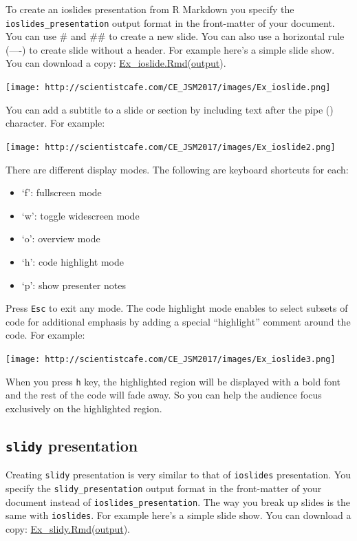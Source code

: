 \documentclass[]{book}
\theoremstyle{definition}
\theoremstyle{definition}
\theoremstyle{remark}
\begin{document}
To create an ioslides presentation from R Markdown you specify the
\texttt{ioslides\_presentation} output format in the front-matter of
your document. You can use \# and \#\# to create a new slide. You can
also use a horizontal rule (----) to create slide without a header. For
example here's a simple slide show. You can download a copy:
\href{https://raw.githubusercontent.com/happyrabbit/linhui.org/gh-pages/CE_JSM2017/Examples/Ex_ioslide.Rmd}{Ex\_ioslide.Rmd}(\href{http://scientistcafe.com/CE_JSM2017/Examples/Ex_ioslide.html}{output}).

\texttt{[image: http://scientistcafe.com/CE\_JSM2017/images/Ex\_ioslide.png]}

You can add a subtitle to a slide or section by including text after the
pipe (\textbar{}) character. For example:

\texttt{[image: http://scientistcafe.com/CE\_JSM2017/images/Ex\_ioslide2.png]}

There are different display modes. The following are keyboard shortcuts
for each:

\begin{itemize}
\item
  `f': fullscreen mode
\item
  `w': toggle widescreen mode
\item
  `o': overview mode
\item
  `h': code highlight mode
\item
  `p': show presenter notes
\end{itemize}

Press \texttt{Esc} to exit any mode. The code highlight mode enables to
select subsets of code for additional emphasis by adding a special
``highlight'' comment around the code. For example:

\texttt{[image: http://scientistcafe.com/CE\_JSM2017/images/Ex\_ioslide3.png]}

When you press \texttt{h} key, the highlighted region will be displayed
with a bold font and the rest of the code will fade away. So you can
help the audience focus exclusively on the highlighted region.

\subsection{\texorpdfstring{\texttt{slidy}
presentation}{slidy presentation}}\label{slidy-presentation}

Creating \texttt{slidy} presentation is very similar to that of
\texttt{ioslides} presentation. You specify the
\texttt{slidy\_presentation} output format in the front-matter of your
document instead of \texttt{ioslides\_presentation}. The way you break
up slides is the same with \texttt{ioslides}. For example here's a
simple slide show. You can download a copy:
\href{https://raw.githubusercontent.com/happyrabbit/linhui.org/gh-pages/CE_JSM2017/Examples/Ex_slidy.Rmd}{Ex\_slidy.Rmd}(\href{http://scientistcafe.com/CE_JSM2017/Examples/Ex_slidy.html}{output}).
\end{document}
